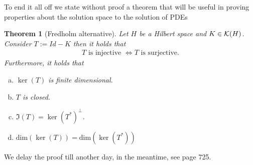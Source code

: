 \documentclass[12pt]{article}
\newtheorem{theorem}{Theorem}
\begin{document}
\begin{CJK*}{UTF8}{gbsn}
	To end it all off we state without proof a theorem that will be useful
	in proving properties about the solution space to the solution of PDEs
	\begin{theorem}[Fredholm alternative] Let $H$ be a Hilbert space and  $K \in \mathcal{K}(H)$. Consider $T:= Id-K$ then it holds that
		\begin{align*}
			T \text{ is injective } \iff  T \text{ is surjective}.
		\end{align*}
		Furthermore, it holds that
		\begin{enumerate}[a)]
			\item $\ker(T)$ is finite dimensional.
			\item  $T$ is closed.
			\item  $\Im (T)=\ker(T^*)^\perp$.
			\item $\mathrm{dim}(\ker(T))=\mathrm{dim}(\ker(T^*))$
		\end{enumerate}
	\end{theorem}
	We delay the proof till another day, in the meantime, see \cite{evans2022partial} page 725.








\end{CJK*}




\end{document}
